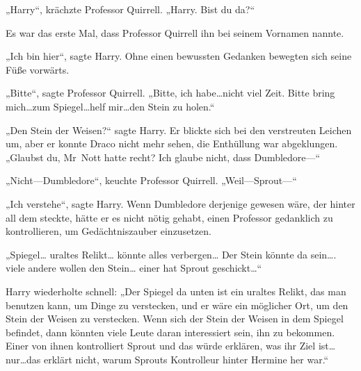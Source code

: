 „Harry“, krächzte Professor Quirrell. „Harry. Bist du da?“

Es war das erste Mal, dass Professor Quirrell ihn bei seinem Vornamen nannte.

„Ich bin hier“, sagte Harry. Ohne einen bewussten Gedanken bewegten sich seine Füße vorwärts.

„Bitte“, sagte Professor Quirrell. „Bitte, ich habe…nicht viel Zeit. Bitte bring mich…zum Spiegel…helf mir…den Stein zu holen.“

„Den Stein der Weisen?“ sagte Harry.
Er blickte sich bei den verstreuten Leichen um, aber er konnte Draco nicht mehr sehen, die Enthüllung war abgeklungen. „Glaubst du, Mr~Nott hatte recht? Ich glaube nicht, dass Dumbledore—“

„Nicht—Dumbledore“, keuchte Professor Quirrell. „Weil—Sprout—“

„Ich verstehe“, sagte Harry.
Wenn Dumbledore derjenige gewesen wäre, der hinter all dem steckte, hätte er es nicht nötig gehabt, einen Professor gedanklich zu kontrollieren, um Gedächtniszauber einzusetzen.

„Spiegel… uraltes Relikt… könnte alles verbergen… Der Stein könnte da sein…. viele andere wollen den Stein… einer hat Sprout geschickt…“

Harry wiederholte schnell:
„Der Spiegel da unten ist ein uraltes Relikt, das man benutzen kann, um Dinge zu verstecken, und er wäre ein möglicher Ort, um den Stein der Weisen zu verstecken. Wenn sich der Stein der Weisen in dem Spiegel befindet, dann könnten viele Leute daran interessiert sein, ihn zu bekommen. Einer von ihnen kontrolliert Sprout und das würde erklären, was ihr Ziel ist…nur…das erklärt nicht, warum Sprouts Kontrolleur hinter Hermine her war.“

